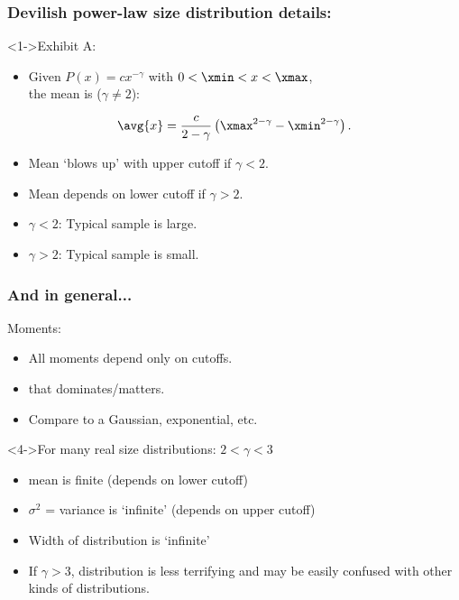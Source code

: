 \begin{frame}
  \frametitle{Devilish power-law size distribution details:}

  \begin{block}<1->{Exhibit A:} 
    \begin{itemize}
    \item 
      Given $P(x) = c x^{-\gamma}$ with $0 < \xmin < x < \xmax$,\\
      the mean is ($\gamma \ne 2$):
    \end{itemize}
    $$ \avg{x} = \frac{c}{2-\gamma} \left( \xmax^{2-\gamma} - \xmin^{2-\gamma} \right). $$
  \end{block}

  \begin{block}{}
    \begin{itemize}
    \item<2->
      Mean `blows up' with upper cutoff if $\gamma < 2$.
    \item<3->
      Mean depends on lower cutoff if $\gamma > 2$.
    \item<4->
      \alert{$\gamma < 2$}: Typical sample is large.
    \item<5->
      \alert{$\gamma > 2$}: Typical sample is small.
    \end{itemize}
  \end{block}



\end{frame}

\begin{frame}
  \frametitle{And in general...}

  \begin{block}{Moments:}
    \begin{itemize}
    \item<1->
      All moments depend only on cutoffs.
    \item<2->
       that dominates/matters.
    \item<3->
      Compare to a Gaussian, exponential, etc.
    \end{itemize}
  \end{block}

  \begin{block}<4->{For many real size distributions: $ 2 < \gamma < 3 $}
    \begin{itemize}
    \item<5-> 
      mean is finite (depends on lower cutoff)
    \item<6-> 
      $\sigma^2$ = variance is `infinite' (depends on upper cutoff)    
    \item<7-> 
      Width of distribution is `infinite'    
    \item<8->
      If $\gamma > 3$, distribution is less terrifying and may
      be easily confused with other kinds of distributions.
    \end{itemize}
  \end{block}


\end{frame}

